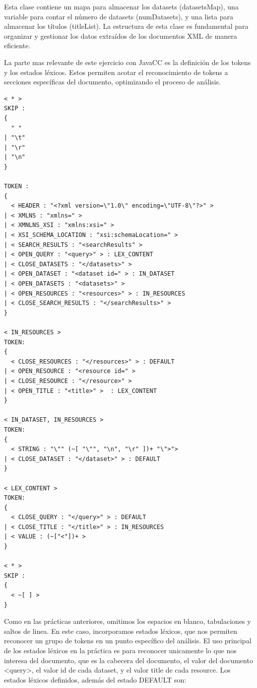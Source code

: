 Esta clase contiene un mapa para almacenar los datasets (datasetsMap), una variable para contar el número de datasets (numDatasets), y una lista para almacenar los títulos (titleList). La estructura de esta clase es fundamental para organizar y gestionar los datos extraídos de los documentos XML de manera eficiente.

La parte mas relevante de este ejercicio con JavaCC es la definición de los tokens y los estados léxicos. Estos permiten acotar el reconocimiento de tokens a secciones específicas del documento, optimizando el proceso de análisis.


\lstset{inputencoding=utf8/latin1}
\begin{lstlisting}
< * >
SKIP :
{
  " " 
| "\t"
| "\r"
| "\n"
} 

TOKEN :
{
  < HEADER : "<?xml version=\"1.0\" encoding=\"UTF-8\"?>" > 
| < XMLNS : "xmlns=" > 
| < XMNLNS_XSI : "xmlns:xsi=" > 
| < XSI_SCHEMA_LOCATION : "xsi:schemaLocation=" > 
| < SEARCH_RESULTS : "<searchResults" >
| < OPEN_QUERY : "<query>" > : LEX_CONTENT
| < CLOSE_DATASETS : "</datasets>" > 
| < OPEN_DATASET : "<dataset id=" > : IN_DATASET
| < OPEN_DATASETS : "<datasets>" > 
| < OPEN_RESOURCES : "<resources>" > : IN_RESOURCES
| < CLOSE_SEARCH_RESULTS : "</searchResults>" >
}

< IN_RESOURCES >
TOKEN:
{
  < CLOSE_RESOURCES : "</resources>" > : DEFAULT
| < OPEN_RESOURCE : "<resource id=" > 
| < CLOSE_RESOURCE : "</resource>" > 
| < OPEN_TITLE : "<title>" >  : LEX_CONTENT
}

< IN_DATASET, IN_RESOURCES >
TOKEN:
{
  < STRING : "\"" (~[ "\"", "\n", "\r" ])+ "\">">
| < CLOSE_DATASET : "</dataset>" > : DEFAULT
}

< LEX_CONTENT >
TOKEN:
{
  < CLOSE_QUERY : "</query>" > : DEFAULT
| < CLOSE_TITLE : "</title>" > : IN_RESOURCES
| < VALUE : (~["<"])+ > 
}

< * >
SKIP :
{
  < ~[ ] >
}
\end{lstlisting}

Como en las prácticas anteriores, omitimos los espacios en blanco, tabulaciones y saltos de linea. En este caso, incorporamos estados léxicos, que nos permiten reconocer un grupo de tokens en un punto específico del análisis. 
El uso principal de los estados léxicos en la práctica es para reconocer unicamente lo que nos interesa del documento, que es la cabecera del documento, el valor del documento <query>, el valor id de cada dataset, y el valor title de cada resource. 
Los estados léxicos definidos, además del estado DEFAULT son:

